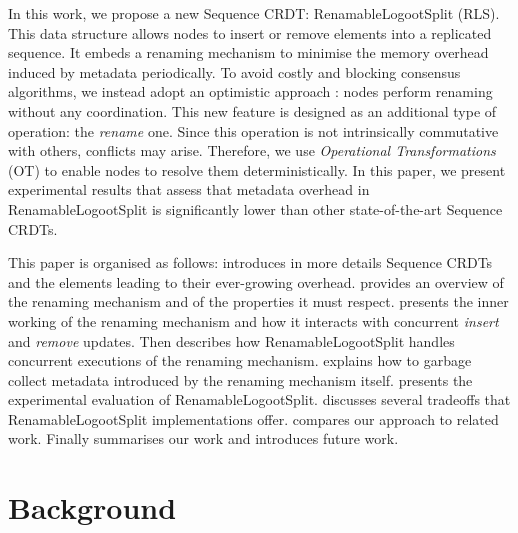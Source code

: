 \documentclass[10pt,journal,compsoc]{IEEEtran}
\begin{document}
In this work, we propose a new Sequence \ac{CRDT}: RenamableLogootSplit (RLS).
This data structure allows nodes to insert or remove elements into a replicated sequence.
It embeds a renaming mechanism to minimise the memory overhead induced by metadata periodically.
To avoid costly and blocking consensus algorithms, we instead adopt an optimistic approach : nodes perform renaming without any coordination.
This new feature is designed as an additional type of operation: the \emph{rename} one.
Since this operation is not intrinsically commutative with others, conflicts may arise.
Therefore, we use \emph{Operational Transformations} (OT) \cite{10.1145/67544.66963,10.1145/289444.289469,4668339} to enable nodes to resolve them deterministically.
In this paper, we present experimental results that assess that metadata overhead in RenamableLogootSplit is significantly lower than other state-of-the-art Sequence \acp{CRDT}.

This paper is organised as follows:
 introduces in more details Sequence \acp{CRDT} and the elements leading to their ever-growing overhead.
 provides an overview of the renaming mechanism and of the properties it must respect.
 presents the inner working of the renaming mechanism and how it interacts with concurrent \emph{insert} and \emph{remove} updates.
Then  describes how RenamableLogootSplit handles concurrent executions of the renaming mechanism.
 explains how to garbage collect metadata introduced by the renaming mechanism itself.
 presents the experimental evaluation of RenamableLogootSplit.
 discusses several tradeoffs that RenamableLogootSplit implementations offer.
 compares our approach to related work.
Finally  summarises our work and introduces future work.


\section{Background}
\label{sec:background}
\end{document}
